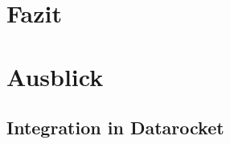\documentclass[
  language=german, %
  type=bachelor%
]{isthesis}
\begin{document}
\begin{content}
\chapter{Fazit}

\chapter{Ausblick}
 \section{Integration in Datarocket}



  

\end{content}



%  







\end{document}
